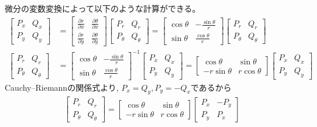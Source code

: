 微分の変数変換によって以下のような計算ができる。
\begin{align*}
    \begin{bmatrix}
        P_x & Q_x\\
        P_y & Q_y
    \end{bmatrix}
    &=
    \begin{bmatrix}
        \frac{\partial r}{\partial x} & \frac{\partial \theta}{\partial x}\\
        \frac{\partial r}{\partial y} & \frac{\partial \theta}{\partial y}
    \end{bmatrix}
    \begin{bmatrix}
        P_r & Q_r\\
        P_\theta & Q_\theta
    \end{bmatrix}
    =
    \begin{bmatrix}
        \cos\theta & -\frac{\sin\theta}{r}\\
        \sin\theta & \frac{\cos\theta}{r}
    \end{bmatrix}
    \begin{bmatrix}
        P_r & Q_r\\
        P_\theta & Q_\theta
    \end{bmatrix}\\
    \begin{bmatrix}
        P_r & Q_r\\
        P_\theta & Q_\theta
    \end{bmatrix}
    &=
    \begin{bmatrix}
        \cos\theta & -\frac{\sin\theta}{r}\\
        \sin\theta & \frac{\cos\theta}{r}
    \end{bmatrix}^{-1}
    \begin{bmatrix}
        P_x & Q_x\\
        P_y & Q_y
    \end{bmatrix}
    =
    \begin{bmatrix}
        \cos\theta & \sin\theta\\
        -r\sin\theta & r\cos\theta
    \end{bmatrix}
    \begin{bmatrix}
        P_x & Q_x\\
        P_y & Q_y
    \end{bmatrix}
\end{align*}
Cauchy--Riemannの関係式より,
$P_x=Q_y, P_y=-Q_x$であるから
\begin{align*}
    \begin{bmatrix}
        P_r & Q_r\\
        P_\theta & Q_\theta
    \end{bmatrix}
    =
    \begin{bmatrix}
        \cos\theta & \sin\theta\\
        -r\sin\theta & r\cos\theta
    \end{bmatrix}
    \begin{bmatrix}
        P_x & -P_y\\
        P_y & P_x
    \end{bmatrix}
\end{align*}

